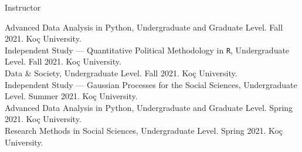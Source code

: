 \documentclass[12pt]{article}
\begin{document}
\begin{minipage}[t]{.3\textwidth}
Instructor\\
\end{minipage}
\begin{minipage}[t]{.65\textwidth}
\FlushLeft
Advanced Data Analysis in Python, Undergraduate and Graduate Level. Fall 2021. Ko\c{c} University.\\
\vspace{.5cm}
\FlushLeft
Independent Study --- Quantitative Political Methodology in \texttt{R}, Undergraduate Level. Fall 2021. Ko\c{c} University.\\
\vspace{.5cm}
Data \& Society, Undergraduate Level. Fall 2021. Ko\c{c} University.\\
\vspace{.5cm}
\FlushLeft
Independent Study --- Gaussian Processes for the Social Sciences, Undergraduate Level. Summer 2021. Ko\c{c} University.\\
\vspace{.5cm}
Advanced Data Analysis in Python, Undergraduate and Graduate Level. Spring 2021. Ko\c{c} University.\\
\vspace{.5cm}
Research Methods in Social Sciences, Undergraduate Level. Spring 2021. Ko\c{c} University.\\
\vspace{.5cm}
\end{minipage}
\begin{minipage}[t]{.3\textwidth}
~\\
\end{minipage}
\end{document}
